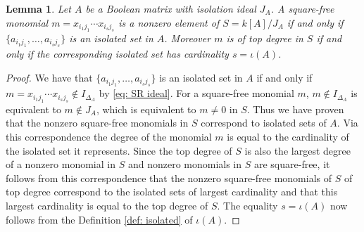 \documentclass[11pt,letterpaper, reqno]{amsart}
\newtheorem{lemma}[theorem]{Lemma}
\theoremstyle{definition}
\theoremstyle{remark}
\DeclareMathOperator{\soc}{socle}
\numberwithin{equation}{section}
\begin{document}
\begin{lemma}\label{lem: top socle=top isolated}
Let $A$ be a Boolean matrix with isolation ideal $J_A$. A square-free monomial $m=x_{i_1j_1}\cdots x_{i_sj_s}$ is a nonzero element of $S=k[A]/J_A$  if and only if $\{a_{i_1j_1},\ldots, a_{i_sj_s}\}$ is an isolated set in $A$. Moreover $m$ is of top degree in $S$ if and only if the corresponding isolated set has cardinality $s=\iota(A)$. 
\end{lemma}
\begin{proof}
We have that  $\{a_{i_1j_1},\ldots, a_{i_sj_s}\}$ is an isolated set in $A$ if and only if  $m=x_{i_1j_1}\cdots x_{i_sj_s}\not \in I_{\Delta_A}$ by \eqref{eq: SR ideal}. For a square-free monomial $m$, $m\not \in I_{\Delta_A}$ is equivalent to $m\not \in J_A$, which is equivalent to $m\neq 0$ in $S$. Thus we have proven that the nonzero square-free monomials in $S$ correspond  to isolated sets of $A$. Via this correspondence the degree of the monomial $m$ is equal to the cardinality of the isolated set it represents. Since the top degree of $S$ is also the largest degree of a nonzero monomial in $S$ and nonzero monomials in $S$ are square-free, it follows from this correspondence that the nonzero square-free monomials of $S$ of top degree correspond to the isolated sets of largest cardinality and that this largest cardinality is equal to the top degree of $S$. The equality $s=\iota(A)$ now follows from the Definition \ref{def: isolated} of $\iota(A)$.




\end{proof}
\end{document}
